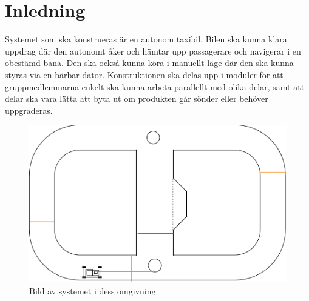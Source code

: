 \documentclass[systemskiss/skiss.tex]{subfiles}
\begin{document}
\section{Inledning}
Systemet som ska konstrueras är en autonom taxibil. Bilen ska kunna klara uppdrag där den autonomt åker och hämtar upp passagerare och navigerar i en obestämd bana. Den ska också kunna köra i manuellt läge där den ska kunna styras via en bärbar dator. Konstruktionen ska delas upp i moduler för att gruppmedlemmarna enkelt ska kunna arbeta parallellt med olika delar, samt att delar ska vara lätta att byta ut om produkten går sönder eller behöver uppgraderas.

\begin{figure}[h]
    \centering
    \includegraphics[width=0.6\linewidth]{systemskiss/figures/systemomgivning.pdf}
    \caption{Bild av systemet i dess omgivning}
    \label{fig:omgivning}
\end{figure}
\end{document}
